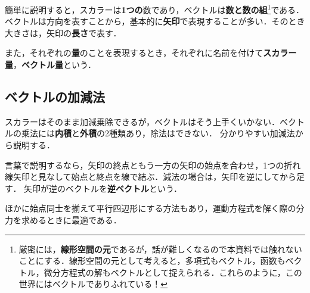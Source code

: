 \documentclass[a4paper,11pt]{ltjsarticle}
\numberwithin{equation}{section}
\begin{document}
簡単に説明すると，スカラーは\textbf{1つの}数であり，ベクトルは\textbf{数と数の組}\footnote{厳密には，\textbf{線形空間の元}であるが，話が難しくなるので本資料では触れないことにする．線形空間の元として考えると，多項式もベクトル，函数もベクトル，微分方程式の解もベクトルとして捉えられる．これらのように，この世界にはベクトルでありふれている！}である．
ベクトルは方向を表すことから，基本的に\textbf{矢印}で表現することが多い．そのとき大きさは，矢印の\textbf{長さ}で表す．

また，それぞれの\textbf{量}のことを表現するとき，それぞれに名前を付けて\textbf{スカラー量}，\textbf{ベクトル量}という．

\subsection{ベクトルの加減法}
\label{sec: vec-cal}

スカラーはそのまま加減乗除できるが，ベクトルはそう上手くいかない．ベクトルの乗法には\textbf{内積}と\textbf{外積}の2種類あり，除法はできない．
分かりやすい加減法から説明する．

言葉で説明するなら，矢印の終点ともう一方の矢印の始点を合わせ，1つの折れ線矢印と見なして始点と終点を線で結ぶ．減法の場合は，矢印を逆にしてから足す．
矢印が逆のベクトルを\textbf{逆ベクトル}という．

ほかに始点同士を揃えて平行四辺形にする方法もあり，運動方程式を解く際の分力を求めるときに最適である．

\hspace{0pt}
\end{document}
